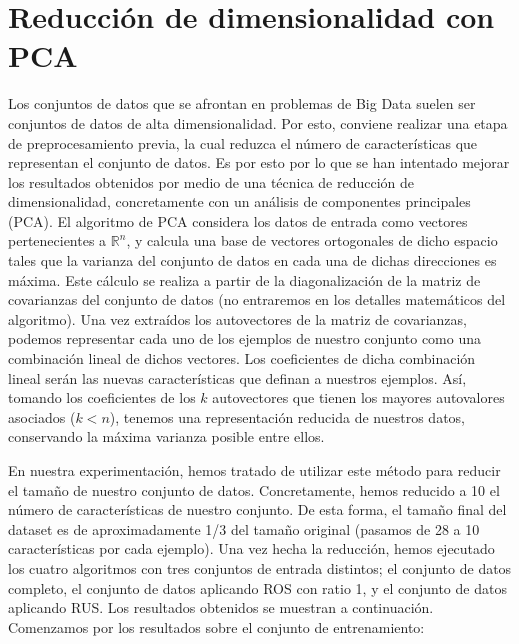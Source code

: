 \documentclass[
  a4paper,
,tablecaptionabove
]{scrartcl}
\begin{document}
\hypertarget{reducciuxf3n-de-dimensionalidad-con-pca}{%
\section{Reducción de dimensionalidad con
PCA}\label{reducciuxf3n-de-dimensionalidad-con-pca}}

Los conjuntos de datos que se afrontan en problemas de Big Data suelen
ser conjuntos de datos de alta dimensionalidad. Por esto, conviene
realizar una etapa de preprocesamiento previa, la cual reduzca el número
de características que representan el conjunto de datos. Es por esto por
lo que se han intentado mejorar los resultados obtenidos por medio de
una técnica de reducción de dimensionalidad, concretamente con un
análisis de componentes principales (PCA). El algoritmo de PCA considera
los datos de entrada como vectores pertenecientes a \(\mathbb{R}^n\), y
calcula una base de vectores ortogonales de dicho espacio tales que la
varianza del conjunto de datos en cada una de dichas direcciones es
máxima. Este cálculo se realiza a partir de la diagonalización de la
matriz de covarianzas del conjunto de datos (no entraremos en los
detalles matemáticos del algoritmo). Una vez extraídos los autovectores
de la matriz de covarianzas, podemos representar cada uno de los
ejemplos de nuestro conjunto como una combinación lineal de dichos
vectores. Los coeficientes de dicha combinación lineal serán las nuevas
características que definan a nuestros ejemplos. Así, tomando los
coeficientes de los \(k\) autovectores que tienen los mayores
autovalores asociados (\(k < n\)), tenemos una representación reducida
de nuestros datos, conservando la máxima varianza posible entre ellos.

En nuestra experimentación, hemos tratado de utilizar este método para
reducir el tamaño de nuestro conjunto de datos. Concretamente, hemos
reducido a 10 el número de características de nuestro conjunto. De esta
forma, el tamaño final del dataset es de aproximadamente 1/3 del tamaño
original (pasamos de 28 a 10 características por cada ejemplo). Una vez
hecha la reducción, hemos ejecutado los cuatro algoritmos con tres
conjuntos de entrada distintos; el conjunto de datos completo, el
conjunto de datos aplicando ROS con ratio 1, y el conjunto de datos
aplicando RUS. Los resultados obtenidos se muestran a continuación.
Comenzamos por los resultados sobre el conjunto de entrenamiento:
\end{document}
